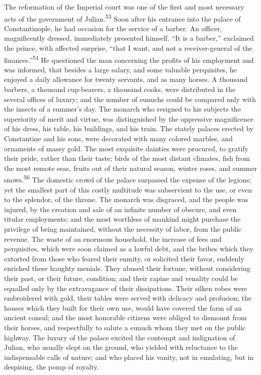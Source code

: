 The reformation of the Imperial court was one of the first and
most necessary acts of the government of Julian.\textsuperscript{53} Soon after
his entrance into the palace of Constantinople, he had occasion
for the service of a barber. An officer, magnificently dressed,
immediately presented himself. “It is a barber,” exclaimed the
prince, with affected surprise, “that I want, and not a
receiver-general of the finances.”\textsuperscript{54} He questioned the man
concerning the profits of his employment and was informed, that
besides a large salary, and some valuable perquisites, he enjoyed
a daily allowance for twenty servants, and as many horses. A
thousand barbers, a thousand cup-bearers, a thousand cooks, were
distributed in the several offices of luxury; and the number of
eunuchs could be compared only with the insects of a summer’s
day. The monarch who resigned to his subjects the superiority of
merit and virtue, was distinguished by the oppressive
magnificence of his dress, his table, his buildings, and his
train. The stately palaces erected by Constantine and his sons,
were decorated with many colored marbles, and ornaments of massy
gold. The most exquisite dainties were procured, to gratify their
pride, rather than their taste; birds of the most distant
climates, fish from the most remote seas, fruits out of their
natural season, winter roses, and summer snows.\textsuperscript{56} The domestic
crowd of the palace surpassed the expense of the legions; yet the
smallest part of this costly multitude was subservient to the
use, or even to the splendor, of the throne. The monarch was
disgraced, and the people was injured, by the creation and sale
of an infinite number of obscure, and even titular employments;
and the most worthless of mankind might purchase the privilege of
being maintained, without the necessity of labor, from the public
revenue. The waste of an enormous household, the increase of fees
and perquisites, which were soon claimed as a lawful debt, and
the bribes which they extorted from those who feared their
enmity, or solicited their favor, suddenly enriched these haughty
menials. They abused their fortune, without considering their
past, or their future, condition; and their rapine and venality
could be equalled only by the extravagance of their dissipations.
Their silken robes were embroidered with gold, their tables were
served with delicacy and profusion; the houses which they built
for their own use, would have covered the farm of an ancient
consul; and the most honorable citizens were obliged to dismount
from their horses, and respectfully to salute a eunuch whom they
met on the public highway. The luxury of the palace excited the
contempt and indignation of Julian, who usually slept on the
ground, who yielded with reluctance to the indispensable calls of
nature; and who placed his vanity, not in emulating, but in
despising, the pomp of royalty.

